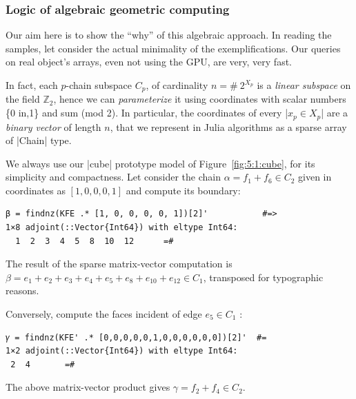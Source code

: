 \begin{coding}[Algebraic computation of FE = $\delta_1$]
\subsubsection*{Logic of algebraic geometric computing}\label{sect:5-2-3}

Our aim here is to show the “why” of this algebraic approach. In reading the samples, let consider the actual minimality of the exemplifications. Our queries on real object’s arrays, even not using the GPU, are very, very fast.

In fact, each $p$-chain subspace $C_p$, of cardinality $n = \#\ {2}^{X_p}$ is a \emph{linear subspace} on the field $\mathbb{Z}_2$, hence we can \emph{parameterize} it using coordinates with scalar numbers \{0 in,1\} and sum (mod 2).
In particular, the coordinates of every |$x_p \in X_p$| are a \emph{binary vector} of length $n$, that we represent in Julia algorithms as a sparse array of |Chain| type.

\begin{coding} We always use our |cube| prototype model of Figure~\ref{fig:5:1:cube}, for its simplicity and compactness. Let consider the chain 
$α = f_1+f_6 \in C_2$ given in coordinates as $[1,0,0,0,1]$ and compute its boundary:
\begin{lstlisting}[language=JuliaLocal, style=julia, mathescape=true]
β = findnz(KFE .* [1, 0, 0, 0, 0, 1])[2]'			#=>
1×8 adjoint(::Vector{Int64}) with eltype Int64:
  1  2  3  4  5  8  10  12		=#
\end{lstlisting}
The result of the sparse matrix-vector computation is $\beta = e_1+ e_2+ e_3+ e_4+ e_5+ e_8+ e_{10}+ e_{12} \in C_1$, transposed for typographic reasons.
\end{coding}

\begin{coding} Conversely, compute the faces incident of edge $e_5 \in C_1$ :
\begin{lstlisting}[language=JuliaLocal, style=julia, mathescape=true]
𝛾 = findnz(KFE' .* [0,0,0,0,0,1,0,0,0,0,0,0])[2]'  #=
1×2 adjoint(::Vector{Int64}) with eltype Int64:
 2  4		=#
\end{lstlisting}
The above matrix-vector product gives $\gamma = f_2+ f_4 \in C_2$.
\end{coding}



\end{coding}

